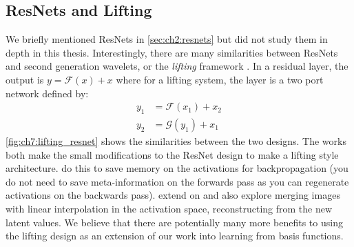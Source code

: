 \subsection{ResNets and Lifting}
\begin{figure}
  \centering
  \qquad
  \label{fig:ch7:lifting_resnet}
\end{figure}

We briefly mentioned ResNets in \autoref{sec:ch2:resnets} but did not study them
in depth in this thesis. Interestingly, there are many similarities between
ResNets and second generation wavelets, or the \emph{lifting} framework
\cite{sweldens_lifting_1998,daubechies_factoring_1998}.
In a residual layer, the output is $y = \mathcal{F}(x) + x$ where for a lifting
system, the layer is a two port network defined by:
\begin{align}
  y_1 &= \mathcal{F}(x_1) + x_2 \\
  y_2 &= \mathcal{G}(y_1) + x_1
\end{align}
\autoref{fig:ch7:lifting_resnet} shows the similarities between the two designs.
The works \cite{gomez_reversible_2017, jacobsen_i-revnet:_2018} both make the small modifications
to the ResNet design to make a lifting style architecture.
\citeauthor{gomez_reversible_2017} \cite{gomez_reversible_2017} do this to save
memory on the activations for backpropagation (you do not need to save
meta-information on the forwards pass as you can regenerate activations on the
backwards pass).
\citeauthor{jacobsen_i-revnet:_2018} \cite{jacobsen_i-revnet:_2018} extend on
\cite{gomez_reversible_2017} and also explore merging images with linear
interpolation in the activation space, reconstructing from the new latent
values. We believe that there are potentially many more benefits to using the
lifting design as an extension of our work into learning from basis functions.

